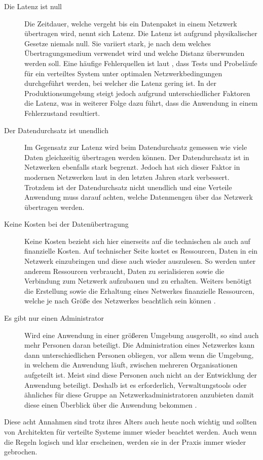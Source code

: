 \begin{description}
  \item[Die Latenz ist null]
  Die Zeitdauer, welche vergeht bis ein Datenpaket in einem Netzwerk übertragen wird, nennt sich Latenz. Die Latenz ist aufgrund physikalischer Gesetze niemals null. Sie variiert stark, je nach dem welches Übertragungsmedium verwendet wird und welche Distanz überwunden werden soll. Eine häufige Fehlerquellen ist laut \cite{rotem2006fallacies}, dass Tests und Probeläufe für ein verteiltes System unter optimalen Netzwerkbedingungen durchgeführt werden, bei welcher die Latenz gering ist. In der Produktionsumgebung steigt jedoch aufgrund unterschiedlicher Faktoren die Latenz, was in weiterer Folge dazu führt, dass die Anwendung in einem Fehlerzustand resultiert. 
  \item[Der Datendurchsatz ist unendlich]
  Im Gegensatz zur Latenz wird beim Datendurchsatz gemessen wie viele Daten gleichzeitig übertragen werden können. Der Datendurchsatz ist in Netzwerken ebenfalls stark begrenzt. Jedoch hat sich dieser Faktor in modernen Netzwerken laut \cite{rotem2006fallacies} in den letzten Jahren stark verbessert. Trotzdem ist der Datendurchsatz nicht unendlich und eine Verteile Anwendung muss darauf achten, welche Datenmengen über das Netzwerk übertragen werden. 
  \item[Keine Kosten bei der Datenübertragung]
  Keine Kosten bezieht sich hier einerseits auf die technischen als auch auf finanzielle Kosten. Auf technischer Seite kostet es Ressourcen, Daten in ein Netzwerk einzubringen und diese auch wieder auszulesen. So werden unter anderem Ressourcen verbraucht, Daten zu serialisieren sowie die Verbindung zum Netzwerk aufzubauen und zu erhalten. Weiters benötigt die Erstellung sowie die Erhaltung eines Netwerkes finanzielle Ressourcen, welche je nach Größe des Netzwerkes beachtlich sein können \cite{rotem2006fallacies}.
  \item[Es gibt nur einen Administrator]
  Wird eine Anwendung in einer größeren Umgebung ausgerollt, so sind auch mehr Personen daran beteiligt. Die Administration eines Netzwerkes kann dann unterschiedlichen Personen obliegen, vor allem wenn die Umgebung, in welchem die Anwendung läuft, zwischen mehreren Organisationen aufgeteilt ist. Meist sind diese Personen auch nicht an der Entwicklung der Anwendung beteiligt. Deshalb ist es erforderlich, Verwaltungstools oder ähnliches für diese Gruppe an Netzwerkadministratoren anzubieten damit diese einen Überblick über die Anwendung bekommen \cite{rotem2006fallacies}. 
\end{description}
Diese acht Annahmen sind trotz ihres Alters auch heute noch wichtig und sollten von Architekten für verteilte Systeme immer wieder beachtet werden. Auch wenn die Regeln logisch und klar erscheinen, werden sie in der Praxis immer wieder gebrochen. \cite{rotem2006fallacies} 

